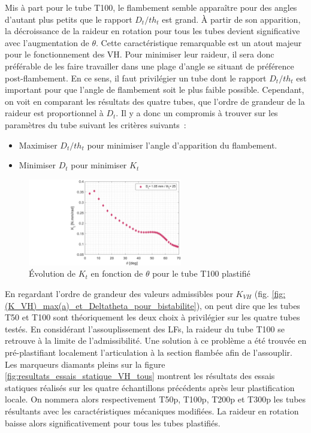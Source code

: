 Mis à part pour le tube T100, le flambement semble apparaître pour des angles d'autant plus petits que le rapport $D_t/th_t$ est grand. À partir de son apparition, la décroissance de la raideur en rotation pour tous les tubes devient significative avec l'augmentation de $\theta$. Cette caractéristique remarquable est un atout majeur pour le fonctionnement des VH. Pour minimiser leur raideur, il sera donc préférable de les faire travailler dans une plage d'angle se situant de préférence post-flambement. En ce sens, il faut privilégier un tube dont le rapport $D_t/th_t$ est important pour que l'angle de flambement soit le plus faible possible. Cependant, on voit en comparant les résultats des quatre tubes, que l'ordre de grandeur de la raideur est proportionnel à $D_t$. Il y a donc un compromis à trouver sur les paramètres du tube suivant les critères suivants :
\begin{itemize}[label=$\circ$]
		\item Maximiser $D_t/th_t$ pour minimiser l'angle d'apparition du flambement.
		\item Minimiser $D_t$ pour minimiser $K_t$
\end{itemize}
\begin{figure}[!htb]
	\begin{center}
		\captionsetup{justification=centering}
		\includegraphics[trim={9.5cm 0cm 0cm 0cm},clip,width=0.6\textwidth]{../Chap4/Figure/(K_VH)_vs_theta_D1mm_plastifie_essai2.pdf}
		\caption{Évolution de $K_t$ en fonction de $\theta$ pour le tube T100 plastifié}
		\label{fig:(K_VH)_vs_theta_D1mm_plastifie}
	\end{center}
\end{figure}    
En regardant l'ordre de grandeur des valeurs admissibles pour $K_{VH}$ (fig. \ref{fig:(K_VH)_max(a)_et_Deltatheta_pour_bistabilite}), on peut dire que les tubes T50 et T100 sont théoriquement les deux choix à privilégier sur les quatre tubes testés. En considérant l'assouplissement des LFs, la raideur du tube T100 se retrouve à la limite de l'admissibilité. Une solution à ce problème a été trouvée en pré-plastifiant localement l'articulation à la section flambée afin de l'assouplir. Les marqueurs diamants pleins sur la figure \ref{fig:resultats_essais_statique_VH_tous} montrent les résultats des essais statiques réalisés sur les quatre échantillons précédents après leur plastification locale. On nommera alors respectivement T50p, T100p, T200p et T300p les tubes résultants avec les caractéristiques mécaniques modifiées. La raideur en rotation baisse alors significativement pour tous les tubes plastifiés. 
